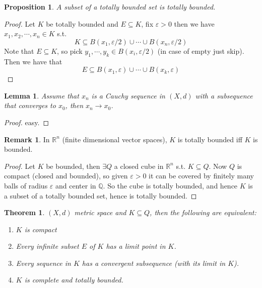 \documentclass[11pt,a4paper]{article}
\theoremstyle{definition}
\newtheorem{remark}[definition]{Remark}
\theoremstyle{plain}
\newtheorem{theorem}[definition]{Theorem}
\newtheorem{lemma}[definition]{Lemma}
\newtheorem{proposition}[definition]{Proposition}
\theoremstyle{remark}
\newcommand{\R}{\mathbb{R}}
\newcommand{\Q}{\mathbb{Q}}
\newcommand{\1}{\mathbbm{1}}
\begin{document}
\begin{proposition}
    $A$ subset of a totally bounded set is totally bounded. 
\end{proposition}

\begin{proof}
    Let $K$ be totally bounded and $E \subseteq K$, fix $\varepsilon >0$ then we have $x_1, x_2, \cdots, x_n \in K$ s.t. 
    $$K \subseteq B(x_1, \varepsilon/2) \cup \cdots \cup B(x_n, \varepsilon/2)$$
    Note that $E \subseteq K$, so pick $y_1, \cdots, y_k \in B(x_i, \varepsilon/2)$ (in case of empty just skip). Then we have that 
    $$E \subseteq B(x_1, \varepsilon) \cup \cdots \cup B(x_k, \varepsilon)$$  
\end{proof}

\begin{lemma}
    Assume that $x_n$ is a Cauchy sequence in $(X, d)$ with a subsequence that converges to $x_0$, then $x_n \to x_0$.    
\end{lemma}

\begin{proof}
    easy.
\end{proof}

\begin{remark}
    In $\R^n$ (finite dimensional vector spaces), $K$ is totally bounded iff $K$ is bounded. 
\end{remark}

\begin{proof}
    Let $K$ be bounded, then $\exists Q$ a closed cube in $\R^n$ s.t. $K \subseteq Q$. Now $Q$ is compact (closed and bounded), so given $\varepsilon > 0$ it can be covered by finitely many balls of radius $\varepsilon$ and center in $\Q$. 
    So the cube is totally bounded, and hence $K$ is a subset of a totally bounded set, hence is totally bounded. 
\end{proof}

\begin{theorem}
    $(X, d)$ metric space and $K \subseteq Q$, then the following are equivalent: 
    \begin{enumerate}[label = \roman*)]
        \item $K$ is compact 
        \item Every infinite subset $E$ of $K$ has a limit point in $K$. 
        \item Every sequence in $K$ has a convergent subsequence (with its limit in $K$). 
        \item $K$ is complete and totally bounded. 
    \end{enumerate}
\end{theorem}
\end{document}
